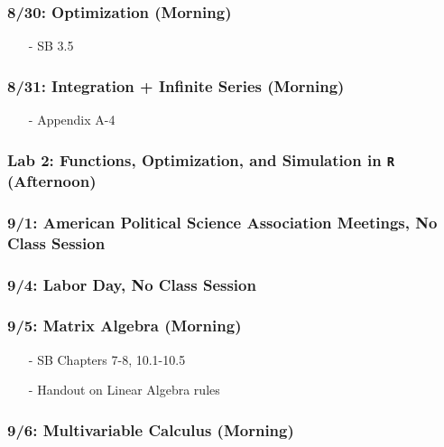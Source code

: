 \documentclass[11pt,letterpaper]{article}
\numberwithin{equation}{section}
\begin{document}
\subsubsection*{8/30: Optimization (Morning)}
\begin{itemize}
\item[-] SB 3.5
\end{itemize}


\subsubsection*{8/31: Integration + Infinite Series (Morning)}
\begin{itemize}
\item[-] Appendix A-4
\end{itemize}

\subsubsection*{Lab 2: Functions, Optimization, and Simulation in {\tt R} (Afternoon)}



\subsubsection*{9/1: American Political Science Association Meetings, No Class Session}

\subsubsection*{9/4: Labor Day, No Class Session}



\subsubsection*{9/5: Matrix Algebra (Morning)}
\begin{itemize}
\item[-] SB Chapters 7-8, 10.1-10.5
\item[-] Handout on Linear Algebra rules
\end{itemize}




\subsubsection*{9/6: Multivariable Calculus (Morning)}
\end{document}

